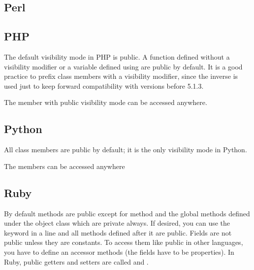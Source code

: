 \documentclass{KodeBook}
\begin{document}
\subsection{Perl}

%

\subsection{PHP}

The default visibility mode in PHP is public.
A function defined without a visibility modifier or a variable defined using  are public by default. 
It is a good practice to prefix class members with a visibility modifier, since the inverse is used just to keep forward compatibility with versions before 5.1.3.



The member with public visibility mode can be accessed anywhere.



\subsection{Python}

All class members are public by default; it is the only visibility mode in Python. 



The members can be accessed anywhere


\subsection{Ruby}

By default methods are public except for  method and the global methods defined under the object class which are private always. 
If desired, you can use the keyword  in a line and all methods defined after it are public. 
Fields are not public unless they are constants. 
To access them like public in other languages, you have to define an accessor methods (the fields have to be properties).
In Ruby, public getters and setters are called  and .
\end{document}
